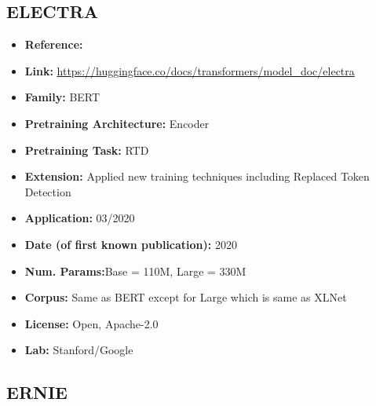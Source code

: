 \documentclass{article}
\begin{document}
\subsection{ELECTRA}
            \begin{itemize}
                \item \textbf{Reference:}~
                \item \textbf{Link:} \url{https://huggingface.co/docs/transformers/model_doc/electra}
                \item \textbf{Family:} BERT
                \item \textbf{Pretraining Architecture:} Encoder
                \item \textbf{Pretraining Task:} RTD
                \item \textbf{Extension:} Applied new training techniques including Replaced Token Detection  
                \item \textbf{Application:} 03/2020
                \item \textbf{Date (of first known publication):} 2020
                \item \textbf{Num. Params:}Base = 110M, Large = 330M
                \item \textbf{Corpus:} Same as BERT except for Large which is same as XLNet
                \item \textbf{License:} Open, Apache-2.0
                \item \textbf{Lab:} Stanford/Google
            \end{itemize}

\subsection{ERNIE}
\end{document}
